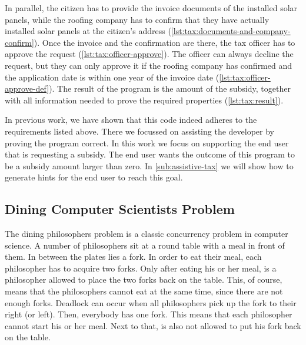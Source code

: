 In parallel, the citizen has to provide the invoice documents of the installed solar panels, while the roofing company has to confirm that they have actually installed solar panels at the citizen's address (\cref{lst:tax:documents-and-company-confirm}).
Once the invoice and the confirmation are there, the tax officer has to approve the request (\cref{lst:tax:officer-approve}).
The officer can always decline the request, but they can only approve it if the roofing company has confirmed and the application date is within one year of the invoice date (\cref{lst:tax:officer-approve-def}).
The result of the program is the amount of the subsidy, together with all information needed to prove the required properties (\cref{lst:tax:result}).

In previous work, we have shown that this code indeed adheres to the requirements listed above.
There we focussed on assisting the developer by proving the program correct.
In this work we focus on supporting the end user that is requesting a subsidy.
The end user wants the outcome of this program to be a subsidy amount larger than zero.
In \cref{sub:assistive-tax} we will show how to generate hints for the end user to reach this goal.


\subsection{Dining Computer Scientists Problem}
\label{sec:dining}

The dining philosophers problem is a classic concurrency problem in computer science.
A number of philosophers sit at a round table with a meal in front of them.
In between the plates lies a fork.
In order to eat their meal, each philosopher has to acquire two forks.
Only after eating his or her meal, is a philosopher allowed to place the two forks back on the table.
This, of course, means that the philosophers cannot eat at the same time, since there are not enough forks.
Deadlock can occur when all philosophers pick up the fork to their right (or left).
Then, everybody has one fork.
This means that each philosopher cannot start his or her meal.
Next to that, is also not allowed to put his fork back on the table.

